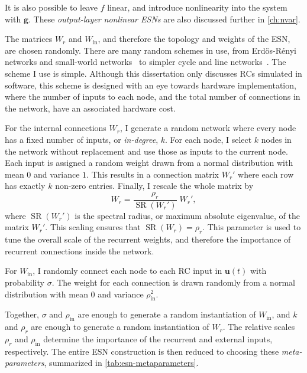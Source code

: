 It is also possible to leave $f$ linear, and introduce nonlinearity
into the system with $\bm{g}$. These \emph{output-layer nonlinear ESNs} are
also discussed further in \cref{ch:nvar}.

The matrices $W_r$ and $W_\text{in}$, and therefore the topology and
weights of the ESN, are chosen randomly. There are many random schemes
in use, from Erd{\"{o}}s-R{\'{e}}nyi networks and small-world
networks~\cite{haluszczynski2019} to simpler cycle and line
networks~\cite{rodan2011}. The scheme I use is simple. Although this
dissertation only discusses RCs simulated in software, this scheme is
designed with an eye towards hardware implementation, where the number
of inputs to each node, and the total number of connections in the
network, have an associated hardware cost.

For the internal connections $W_r$, I generate a random network where
every node has a fixed number of inputs, or \emph{in-degree}, $k$. For
each node, I select $k$ nodes in the network without replacement and
use those as inputs to the current node. Each input is assigned a
random weight drawn from a normal distribution with mean $0$ and
variance $1$. This results in a connection matrix $W_r'$ where each
row has exactly $k$ non-zero entries. Finally, I rescale the whole
matrix by
\begin{equation}
  \label{eq:setradius}
  W_r = \frac{\rho_r}{\operatorname{SR}(W_r')}\;W_r',
\end{equation}
where $\operatorname{SR}(W_r')$ is the spectral radius, or maximum
absolute eigenvalue, of the matrix $W_r'$. This scaling ensures that
$\operatorname{SR}(W_r) = \rho_r$. This parameter is used to tune the
overall scale of the recurrent weights, and therefore the importance
of recurrent connections inside the network.

For $W_\text{in}$, I randomly connect each node to each RC input in
$\bm{u}(t)$ with probability $\sigma$. The weight for each connection
is drawn randomly from a normal distribution with mean $0$ and
variance $\rho_\text{in}^2$.

Together, $\sigma$ and $\rho_\text{in}$ are enough to generate a
random instantiation of $W_\text{in}$, and $k$ and $\rho_r$ are enough
to generate a random instantiation of $W_r$. The relative scales
$\rho_r$ and $\rho_\text{in}$ determine the importance of the
recurrent and external inputs, respectively. The entire ESN construction
is then reduced to choosing these \emph{meta-parameters}, summarized in
\cref{tab:esn-metaparameters}.

